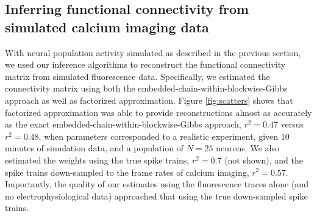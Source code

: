 \documentclass[aoas,preprint]{imsart}
\begin{document}
\subsection{Inferring functional connectivity from simulated calcium imaging data} \label{sec:results:inference}

With neural population activity simulated as described in the previous section, we used our inference algorithms to reconstruct the functional connectivity matrix from simulated fluorescence data. Specifically, we estimated the connectivity matrix using both the embedded-chain-within-blockwise-Gibbs approach as well as factorized approximation. Figure \ref{fig:scatters} shows that factorized approximation was able to provide reconstructions almost as accurately as the exact embedded-chain-within-blockwise-Gibbs approach, $r^2=0.47$ versus $r^2=0.48$, when parameters corresponded to a realistic experiment, given $10$ minutes of simulation data, and a population of $N=25$ neurons. We also estimated the weights using the true spike trains, $r^2=0.7$ (not shown), and the spike trains down-sampled to the frame rates of calcium imaging, $r^2=0.57$. Importantly, the quality of our estimates using the fluorescence traces alone (and no electrophysiological data) approached that using the true down-sampled spike trains.  
\end{document}
